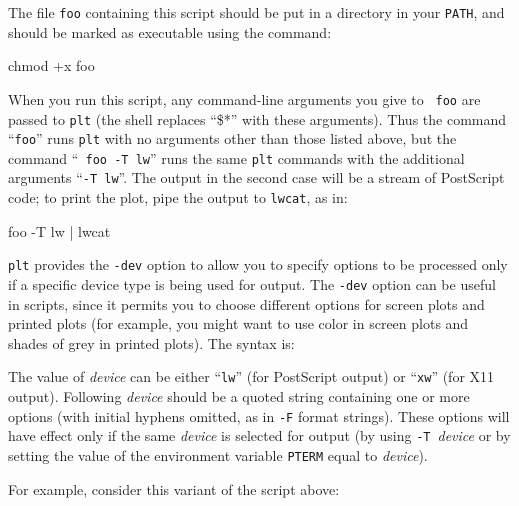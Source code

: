 \documentclass{book}
\begin{document}
The file {\tt foo} containing this script should be put in a directory
in your {\tt PATH}, and should be marked as executable using the
command:

\begin{center}
\begin{boxedverbatim}
chmod +x foo
\end{boxedverbatim}
\end{center}

%
When you run this script, any command-line arguments you give to {\tt
foo} are passed to {\tt plt} (the shell replaces ``\$*'' with these
arguments).  Thus the command ``{\tt foo}'' runs {\tt plt} with no
arguments other than those listed above, but the command ``{\tt
foo~-T~lw}'' runs the same {\tt plt} commands with the additional arguments
``{\tt -T lw}''.  The output in the second case will be a stream of
PostScript code; to print the plot, pipe the output to {\tt lwcat}, as in:

\begin{center}
\begin{boxedverbatim}
foo -T lw | lwcat
\end{boxedverbatim}
\end{center}

{\tt plt} provides the {\tt -dev} option to allow you to specify
options to be processed only if a specific device type is being used
for output.  The {\tt -dev} option can be useful in scripts, since
it permits you to choose different options for screen plots and
printed plots (for example, you might want to use color in screen
plots and shades of grey in printed plots).  The syntax is:

\begin{description}
%
\item[{\tt -dev} {\em device} {\tt "}{\em options ...}{\tt "}]
The value of {\em device} can be either ``{\tt lw}'' (for PostScript output)
or ``{\tt xw}'' (for X11 output).  Following {\em device} should be a
quoted string containing one or more options (with initial hyphens
omitted, as in {\tt -F} format strings).  These options will have
effect only if the same {\em device} is selected for output
(by using {\tt -T}~{\em device} or by setting the value of the
environment variable {\tt PTERM} equal to {\em device}).
\end{description}

For example, consider this variant of the script above:
\end{document}
